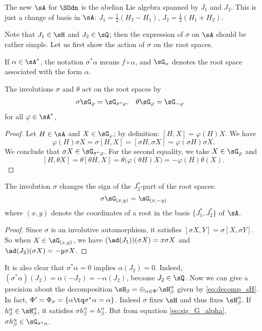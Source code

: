 \begin{remark}
	The new $\sA$ for $\SOdn$ is the abelian Lie algebra spanned by $J_1$ and $J_2$. This is just a change of basis in $\sA$: $J_1=\frac{1}{2}(H_2-H_1)$, $J_2=\frac{1}{2}(H_1+H_2)$.
\end{remark}
Note that $J_1\in\sH$ and $J_2\in\sQ$; then the expression of $\sigma$ on $\sA$ should be rather simple. Let us first show the action of $\sigma$ on the root spaces.

If $\alpha\in\sA^*$, the notation $\sigma^*\alpha$ means $f\circ\alpha$, and $\sG_{\alpha}$ denotes the root space associated with the form $\alpha$.

\begin{lemma}			\label{LemSigmaThetaRootSpaces}
	The involutions $\sigma$ and $\theta$ act on the root spaces by
	\begin{align}		\label{eq:sig_G_alpha}
		\sigma\sG_{\varphi} & =\sG_{\sigma^*\varphi},
		                    & \theta\sG_{\varphi}     & =\sG_{-\varphi}
	\end{align}
	for all $\varphi\in\sA^*$,
\end{lemma}

\begin{proof}
	Let $H\in \sA$ and $X\in\sG_{\varphi}$; by definition: $[H,X]=\varphi(H)X$. We have
	\[
		\varphi(H)\sigma X=\sigma[H,X]=[\sigma H,\sigma X]=\varphi(\sigma H)\sigma X.
	\]
	We conclude that $\sigma X\in\sG_{\sigma^*\varphi}$. For the second equality, we take $X\in\sG_{\varphi}$ and
	\[
		[H,\theta X]=\theta[\theta H,X]=\theta\big( \varphi(\theta H)X \big)=-\varphi(H)\theta(X).
	\]
\end{proof}

\begin{lemma}		\label{LemSigmaChangeDeux}
	The involution $\sigma$ changes the sign of the $J_{2}^*$-part of the root spaces:
	\[
		\sigma\sG_{(x,y)}=\sG_{(x,-y)}
	\]
	where $(x,y)$ denote the coordinates of a root in the basis $\{ J_1^*,J_2^* \}$ of $\sA$.
\end{lemma}

\begin{proof}
	Since $\sigma$ is an involutive automorphism, it satisfies $[\sigma X,Y]=\sigma[X,\sigma Y]$. So when $X\in\sG_{(x,y)}$, we have $(\ad(J_{1}))(\sigma X)=x\sigma X$ and $\ad(J_{2})(\sigma X)=-y\sigma X$.

\end{proof}

It is also clear that $\sigma^*\alpha=0$ implies $\alpha(J_2)=0$. Indeed, $(\sigma^*\alpha)(J_2)=\alpha(-J_2) =-\alpha(J_2)$, because $J_{2}\in\sQ$.
Now we can give a precision about the decomposition $\sH_{\beta}=\oplus_{\alpha\in\Phi'}\sH_{\beta}^{\alpha}$ given by \eqref{eq:decomp_sH}. In fact, $\Phi'=\Phi_{\sigma}=\{\alpha\tq \sigma^*\alpha=\alpha\}$. Indeed $\sigma$ fixes $\sH$ and thus fixes $\sH_{\beta}^{\alpha}$. If $h_{\beta}^{\alpha}\in\sH_{\beta}^{\alpha}$, it satisfies $\sigma h_{\beta}^{\alpha}=h_{\beta}^{\alpha}$. But from equation \eqref{eq:sig_G_alpha}, $\sigma h_{\beta}^{\alpha}\in \sG_{\sigma^*\alpha}$.


